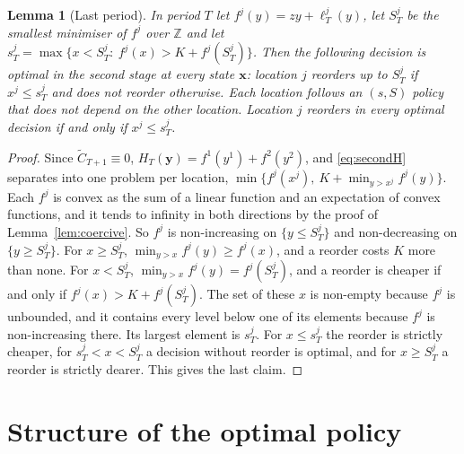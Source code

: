 \documentclass[11pt]{article}
\renewcommand{\vec}[1]{\boldsymbol{#1}}
\newcommand{\Z}{\mathbb{Z}}
\newcommand{\Ct}{\widetilde{C}}
\newtheorem{lemma}{Lemma}
\theoremstyle{definition}
\begin{document}
\begin{lemma}[Last period]\label{lem:last}
In period $T$ let $f^j(y)=zy+\ell^j_T(y)$, let $S^j_T$ be the smallest minimiser of $f^j$ over $\Z$ and let $s^j_T=\max\{x<S^j_T:\ f^j(x)>K+f^j(S^j_T)\}$. Then the following decision is optimal in the second stage at every state $\vec{x}$: location $j$ reorders up to $S^j_T$ if $x^j\le s^j_T$ and does not reorder otherwise. Each location follows an $(s,S)$ policy that does not depend on the other location. Location $j$ reorders in every optimal decision if and only if $x^j\le s^j_T$.
\end{lemma}

\begin{proof}
Since $\Ct_{T+1}\equiv0$, $H_T(\vec{y})=f^1(y^1)+f^2(y^2)$, and \eqref{eq:secondH} separates into one problem per location, $\min\{f^j(x^j),\ K+\min_{y>x^j}f^j(y)\}$. Each $f^j$ is convex as the sum of a linear function and an expectation of convex functions, and it tends to infinity in both directions by the proof of Lemma~\ref{lem:coercive}. So $f^j$ is non-increasing on $\{y\le S^j_T\}$ and non-decreasing on $\{y\ge S^j_T\}$. For $x\ge S^j_T$, $\min_{y>x}f^j(y)\ge f^j(x)$, and a reorder costs $K$ more than none. For $x<S^j_T$, $\min_{y>x}f^j(y)=f^j(S^j_T)$, and a reorder is cheaper if and only if $f^j(x)>K+f^j(S^j_T)$. The set of these $x$ is non-empty because $f^j$ is unbounded, and it contains every level below one of its elements because $f^j$ is non-increasing there. Its largest element is $s^j_T$. For $x\le s^j_T$ the reorder is strictly cheaper, for $s^j_T<x<S^j_T$ a decision without reorder is optimal, and for $x\ge S^j_T$ a reorder is strictly dearer. This gives the last claim.
\end{proof}

\section{Structure of the optimal policy}\label{sec:theorem}
\end{document}
